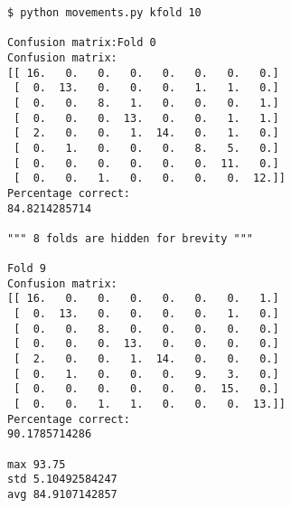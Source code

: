 \documentclass{article}
\begin{document}
\begin{verbatim}
$ python movements.py kfold 10

Confusion matrix:Fold 0
Confusion matrix:
[[ 16.   0.   0.   0.   0.   0.   0.   0.]
 [  0.  13.   0.   0.   0.   1.   1.   0.]
 [  0.   0.   8.   1.   0.   0.   0.   1.]
 [  0.   0.   0.  13.   0.   0.   1.   1.]
 [  2.   0.   0.   1.  14.   0.   1.   0.]
 [  0.   1.   0.   0.   0.   8.   5.   0.]
 [  0.   0.   0.   0.   0.   0.  11.   0.]
 [  0.   0.   1.   0.   0.   0.   0.  12.]]
Percentage correct:
84.8214285714

""" 8 folds are hidden for brevity """

Fold 9
Confusion matrix:
[[ 16.   0.   0.   0.   0.   0.   0.   1.]
 [  0.  13.   0.   0.   0.   0.   1.   0.]
 [  0.   0.   8.   0.   0.   0.   0.   0.]
 [  0.   0.   0.  13.   0.   0.   0.   0.]
 [  2.   0.   0.   1.  14.   0.   0.   0.]
 [  0.   1.   0.   0.   0.   9.   3.   0.]
 [  0.   0.   0.   0.   0.   0.  15.   0.]
 [  0.   0.   1.   1.   0.   0.   0.  13.]]
Percentage correct:
90.1785714286

max 93.75
std 5.10492584247
avg 84.9107142857
\end{verbatim}
\end{document}
